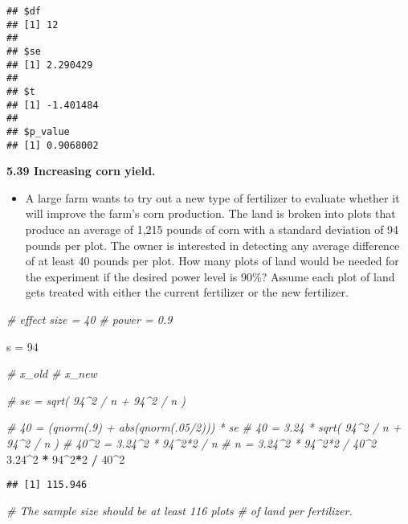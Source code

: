 \documentclass[]{book}
\newenvironment{Shaded}{\begin{snugshade}}{\end{snugshade}}
\newcommand{\CommentTok}[1]{\textcolor[rgb]{0.56,0.35,0.01}{\textit{#1}}}
\newcommand{\DecValTok}[1]{\textcolor[rgb]{0.00,0.00,0.81}{#1}}
\newcommand{\FloatTok}[1]{\textcolor[rgb]{0.00,0.00,0.81}{#1}}
\newcommand{\NormalTok}[1]{#1}
\newcommand{\OperatorTok}[1]{\textcolor[rgb]{0.81,0.36,0.00}{\textbf{#1}}}
\newcommand{\StringTok}[1]{\textcolor[rgb]{0.31,0.60,0.02}{#1}}
\providecommand{\tightlist}{%
  \setlength{\itemsep}{0pt}\setlength{\parskip}{0pt}}
\begin{document}
\begin{verbatim}
## $df
## [1] 12
## 
## $se
## [1] 2.290429
## 
## $t
## [1] -1.401484
## 
## $p_value
## [1] 0.9068002
\end{verbatim}

\textbf{5.39 Increasing corn yield.}

\begin{itemize}
\tightlist
\item
  A large farm wants to try out a new type of fertilizer to evaluate whether it will improve the farm's corn production. The land is broken into plots that produce an average of 1,215 pounds of corn with a standard deviation of 94 pounds per plot. The owner is interested in detecting any average difference of at least 40 pounds per plot. How many plots of land would be needed for the experiment if the desired power level is 90\%? Assume each plot of land gets treated with either the current fertilizer or the new fertilizer.
\end{itemize}

\begin{Shaded}
\begin{Highlighting}[]
\CommentTok{# effect size = 40}
\CommentTok{# power = 0.9}

\NormalTok{s =}\StringTok{ }\DecValTok{94}

\CommentTok{# x_old}
\CommentTok{# x_new}

\CommentTok{# se = sqrt( 94^2 / n + 94^2 / n )}

\CommentTok{# 40 = (qnorm(.9) + abs(qnorm(.05/2))) * se}
\CommentTok{# 40 = 3.24 * sqrt( 94^2 / n + 94^2 / n )}
\CommentTok{# 40^2 = 3.24^2 * 94^2*2 / n}
\CommentTok{# n = 3.24^2 * 94^2*2 / 40^2}
\FloatTok{3.24}\OperatorTok{^}\DecValTok{2} \OperatorTok{*}\StringTok{ }\DecValTok{94}\OperatorTok{^}\DecValTok{2}\OperatorTok{*}\DecValTok{2} \OperatorTok{/}\StringTok{ }\DecValTok{40}\OperatorTok{^}\DecValTok{2}
\end{Highlighting}
\end{Shaded}

\begin{verbatim}
## [1] 115.946
\end{verbatim}

\begin{Shaded}
\begin{Highlighting}[]
\CommentTok{# The sample size should be at least 116 plots}
\CommentTok{# of land per fertilizer.}
\end{Highlighting}
\end{Shaded}
\end{document}
